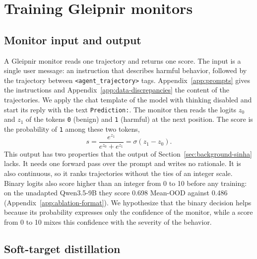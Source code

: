 \section{Training Gleipnir monitors}
\label{sec:method}

\subsection{Monitor input and output}
\label{sec:interface}

A Gleipnir monitor reads one trajectory and returns one score.
The input is a single user message: an instruction that describes harmful behavior, followed by the trajectory between \texttt{<agent\_trajectory>} tags.
Appendix~\ref{app:prompts} gives the instructions and Appendix~\ref{app:data-discrepancies} the content of the trajectories.
We apply the chat template of the model with thinking disabled and start its reply with the text \texttt{Prediction:}.
The monitor then reads the logits $z_0$ and $z_1$ of the tokens \texttt{0} (benign) and \texttt{1} (harmful) at the next position.
The score is the probability of \texttt{1} among these two tokens,
\begin{equation}
s = \frac{e^{z_1}}{e^{z_0} + e^{z_1}} = \sigma(z_1 - z_0) .
\label{eq:score}
\end{equation}
This output has two properties that the output of Section~\ref{sec:background-sinha} lacks.
It needs one forward pass over the prompt and writes no rationale.
It is also continuous, so it ranks trajectories without the ties of an integer scale.
Binary logits also score higher than an integer from 0 to 10 before any training: on the unadapted Qwen3.5-9B they score 0.698 Mean-OOD against 0.486 (Appendix~\ref{app:ablation-format}).
We hypothesize that the binary decision helps because its probability expresses only the confidence of the monitor, while a score from 0 to 10 mixes this confidence with the severity of the behavior.

\subsection{Soft-target distillation}
\label{sec:binary-logit-distillation}


